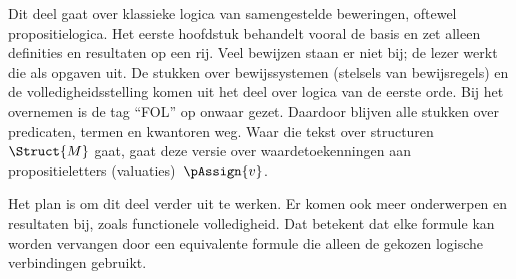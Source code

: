 \documentclass[openany]{memoir}
\begin{document}
\begingroup
\def\olfilename{OLP-0055}
\def\olfilepath{content/propositional-logic/}
\hypertarget{unit-OLP-0055}{}




\begin{editorial}
  Dit deel gaat over klassieke logica van samengestelde beweringen,
  oftewel propositielogica. Het eerste hoofdstuk behandelt vooral de
  basis en zet alleen definities en resultaten op een rij. Veel bewijzen
  staan er niet bij; de lezer werkt die als opgaven uit. De stukken over
  bewijssystemen (stelsels van bewijsregels) en de volledigheidsstelling
  komen uit het deel over logica van de eerste orde. Bij het overnemen is
  de tag ``FOL'' op onwaar gezet. Daardoor blijven alle stukken over
  predicaten, termen en kwantoren weg. Waar die tekst over
  structuren~$\Struct{M}$ gaat, gaat deze versie over waardetoekenningen
  aan propositieletters (valuaties)~$\pAssign{v}$.

  Het plan is om dit deel verder uit te werken. Er komen ook meer
  onderwerpen en resultaten bij, zoals functionele volledigheid. Dat
  betekent dat elke formule kan worden vervangen door een equivalente
  formule die alleen de gekozen logische verbindingen gebruikt.
\end{editorial}









\endgroup

\begingroup
\def\olfilename{OLP-0056}
\def\olfilepath{content/propositional-logic/syntax-and-semantics/}
\hypertarget{unit-OLP-0056}{}
\end{document}

